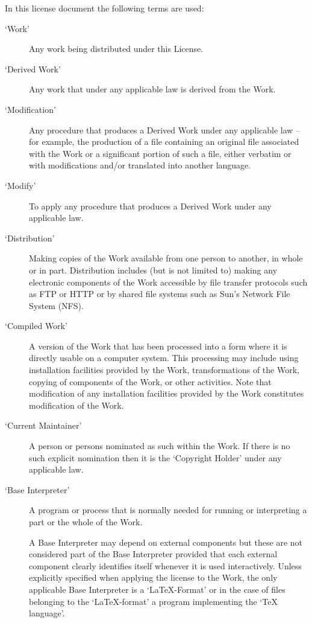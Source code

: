 In this license document the following terms are used:
\begin{description}
   \item [`Work']
    Any work being distributed under this License.
    
   \item [`Derived Work']
    Any work that under any applicable law is derived from the Work.

   \item [`Modification']
    Any procedure that produces a Derived Work under any applicable
    law -- for example, the production of a file containing an
    original file associated with the Work or a significant portion of
    such a file, either verbatim or with modifications and/or
    translated into another language.

   \item [`Modify']
    To apply any procedure that produces a Derived Work under any
    applicable law.
    
   \item [`Distribution']
    Making copies of the Work available from one person to another, in
    whole or in part.  Distribution includes (but is not limited to)
    making any electronic components of the Work accessible by
    file transfer protocols such as FTP or HTTP or by shared file
    systems such as Sun's Network File System (NFS).

   \item [`Compiled Work']
    A version of the Work that has been processed into a form where it
    is directly usable on a computer system.  This processing may
    include using installation facilities provided by the Work,
    transformations of the Work, copying of components of the Work, or
    other activities.  Note that modification of any installation
    facilities provided by the Work constitutes modification of the Work.

   \item [`Current Maintainer']
    A person or persons nominated as such within the Work.  If there is
    no such explicit nomination then it is the `Copyright Holder' under
    any applicable law.

   \item [`Base Interpreter']
    A program or process that is normally needed for running or
    interpreting a part or the whole of the Work.    

    A Base Interpreter may depend on external components but these
    are not considered part of the Base Interpreter provided that each
    external component clearly identifies itself whenever it is used
    interactively.  Unless explicitly specified when applying the
    license to the Work, the only applicable Base Interpreter is a
    `LaTeX-Format' or in the case of files belonging to the 
    `LaTeX-format' a program implementing the `TeX language'.
\end{description}


